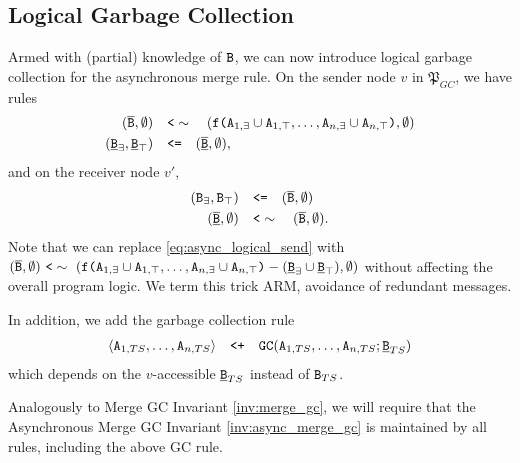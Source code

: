 \documentclass{article}
\numberwithin{equation}{section}
\renewcommand{\tt}[1]{\ifmmode\text{\texttt{#1}}\else\texttt{#1}\fi}
\begin{document}
\subsection{Logical Garbage Collection}
Armed with (partial) knowledge of $\tt{B}$, we can now introduce logical garbage collection for the asynchronous merge rule.
On the sender node $v$ in $\mathfrak{P}_{GC}$, we have rules
\begin{align}
(\overline{\tt{B}},\emptyset) &\quad\tt{<}\sim\quad (\tt{f}\tt{(}\tt{A}_{1,\exists} \cup \tt{A}_{1,\top}, \dots, \tt{A}_{n,\exists} \cup \tt{A}_{n,\top}\tt{)}, \emptyset)\label{eq:async_logical_send}\\
(\underline{\tt{B}}_\exists, \underline{\tt{B}}_\top) &\quad\tt{<=}\quad (\overline{\underline{\tt{B}}}, \emptyset),\nonumber
\end{align}
and on the receiver node $v'$,
\begin{align*}
(\tt{B}_\exists, \tt{B}_\top) &\quad\tt{<=}\quad (\overline{\tt{B}}, \emptyset)\\
(\overline{\underline{\tt{B}}}, \emptyset) &\quad\tt{<}\sim\quad (\overline{\tt{B}}, \emptyset).
\end{align*}
Note that we can replace \eqref{eq:async_logical_send} with $(\overline{\tt{B}},\emptyset) ~\tt{<}\sim~ (\tt{f}\tt{(}\tt{A}_{1,\exists} \cup \tt{A}_{1,\top}, \dots, \tt{A}_{n,\exists} \cup \tt{A}_{n,\top}\tt{)}  - (\underline{\tt{B}}_\exists \cup \underline{\tt{B}}_\top), \emptyset)$ without affecting the overall program logic.
We term this trick ARM, avoidance of redundant messages.

In addition, we add the garbage collection rule
\begin{align}
\langle \tt{A}_{1,TS}, \dots, \tt{A}_{n,TS} \rangle
\quad\tt{<+}\quad
\tt{GC}(\tt{A}_{1,TS}, \dots, \tt{A}_{n,TS}; \underline{\tt{B}}_{TS})
\end{align}
which depends on the $v$-accessible $\underline{\tt{B}}_{TS}$ instead of $\tt{B}_{TS}$.

Analogously to Merge GC Invariant \ref{inv:merge_gc}, we will require that the Asynchronous Merge GC Invariant \ref{inv:async_merge_gc} is maintained by all rules, including the above GC rule.
\end{document}
